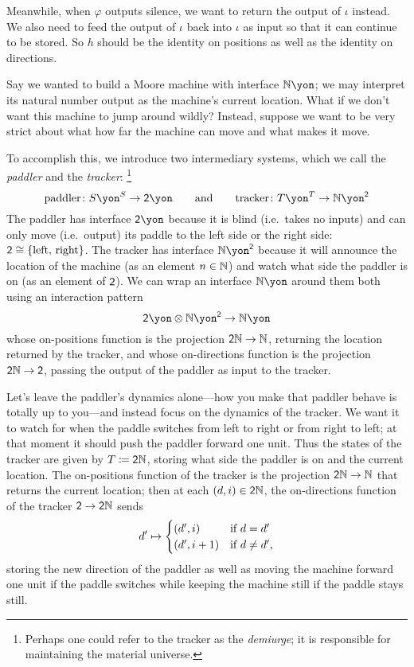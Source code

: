 \documentclass[Book-Poly]{subfiles}
\begin{document}
\begin{example}[Repeater]
Meanwhile, when $\varphi$ outputs silence, we want to return the output of $\iota$ instead.
We also need to feed the output of $\iota$ back into $\iota$ as input so that it can continue to be stored.
So $h$ should be the identity on positions as well as the identity on directions.
\end{example}

\begin{example}[Paddling]\label{ex.paddler}
Say we wanted to build a Moore machine with interface $\nn\yon$; we may interpret its natural number output as the machine's current location.
What if we don't want this machine to jump around wildly?
Instead, suppose we want to be very strict about what how far the machine can move and what makes it move.

To accomplish this, we introduce two intermediary systems, which we call the \emph{paddler} and the \emph{tracker}:%
\footnote{Perhaps one could refer to the tracker as the \emph{demiurge}; it is responsible for maintaining the material universe.}
\[
  \text{paddler}\colon S\yon^S\to\2\yon
  \qqand
  \text{tracker}\colon T\yon^T\to\nn\yon^\2
\]
The paddler has interface $\2\yon$ because it is blind (i.e.\ takes no inputs) and can only move (i.e.\ output) its paddle to the left side or the right side: $\textsf{2}\cong\{\text{left, right}\}$. The tracker has interface $\nn\yon^\2$ because it will announce the location of the machine (as an element $n\in\mathbb{N}$) and watch what side the paddler is on (as an element of $\textsf{2}$). 
We can wrap an interface $\nn\yon$ around them both using an interaction pattern
\[
    \2\yon\otimes\nn\yon^\2\to\nn\yon
\]
whose on-positions function is the projection $\textsf{2}\mathbb{N}\to\mathbb{N}$, returning the location returned by the tracker, and whose on-directions function is the projection $\textsf{2}\mathbb{N}\to\textsf{2}$, passing the output of the paddler as input to the tracker.

Let's leave the paddler's dynamics alone---how you make that paddler behave is totally up to you---and instead focus on the dynamics of the tracker.
We want it to watch for when the paddle switches from left to right or from right to left; at that moment it should push the paddler forward one unit. Thus the states of the tracker are given by $T\coloneqq\textsf{2}\mathbb{N}$, storing what side the paddler is on and the current location.
The on-positions function of the tracker is the projection $\textsf{2}\mathbb{N}\to\mathbb{N}$ that returns the current location; then at each $(d,i)\in\textsf{2}\mathbb{N}$, the on-directions function of the tracker $\textsf{2}\to\textsf{2}\mathbb{N}$ sends
\[
  d'\mapsto
	\begin{cases}
		(d',i)&\textnormal{if }d=d'\\
		(d',i+1)&\textnormal{if }d\neq d',
	\end{cases}
\]
storing the new direction of the paddler as well as moving the machine forward one unit if the paddle switches while keeping the machine still if the paddle stays still.
\end{example}
\end{document}
